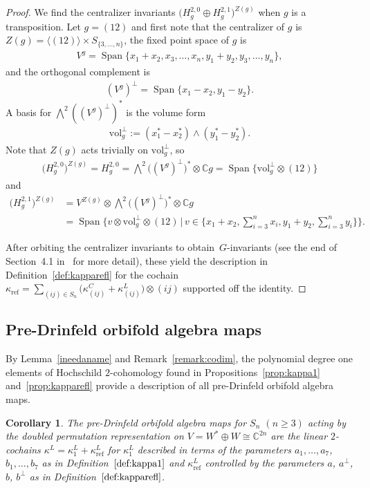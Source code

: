 \documentclass[pdftex]{sigma}
\numberwithin{equation}{section}
\newtheorem{Corollary}[Theorem]{Corollary}
\newcommand{\vol}[1]{\text{vol}_{#1}^{\perp}}
\DeclareMathOperator{\Span}{Span}
\DeclareMathOperator{\refl}{ref}
\begin{document}
\begin{proof}
We find the centralizer invariants $\big(H_g^{2,0}\oplus H_g^{2,1}\big)^{Z(g)}$ when $g$ is a transposition.
Let $g=(12)$ and first note that the centralizer of $g$ is $Z(g)=\langle (12) \rangle \times S_{\{3,\dots,n\}}$, the fixed point space of $g$ is
\begin{gather*}
V^g=\Span\{x_1+x_2,x_3,\dots,x_n,y_1+y_2,y_3,\dots,y_n\},
\end{gather*}
and the orthogonal complement is
\begin{gather*}
(V^g)^\perp=\Span\{x_1-x_2,y_1-y_2\}.
\end{gather*}
A basis for $\bigwedge^2 ((V^g)^{\perp})^*$
is the volume form
	\begin{gather*}
	\vol{g}:=(x_1^*-x_2^*)\wedge (y_1^*-y_2^*).
	\end{gather*}
Note that $Z(g)$ acts trivially on $\vol{g}$, so
 	\begin{gather*}
	\big(H_g^{2,0}\big)^{Z(g)}=H_g^{2,0}=\bigwedge\nolimits^{\! 2} \big((V^g)^{\perp}\big)^* \otimes \mathbb{C} g=\Span\big\{\vol{g} \otimes (12) \big\}
	\end{gather*}
and
\begin{align*}
\big(H_g^{2,1}\big)^{Z(g)}& =V^{Z(g)}\otimes\bigwedge\nolimits^{\! 2} \big((V^g)^{\perp}\big)^* \otimes \mathbb{C} g
\\
&=\Span\bigg\{v \otimes \vol{g} \otimes (12) \,\bigg\vert\, v \in \bigg\{x_1+x_2, \sum\limits_{i=3}^n x_i, y_1+y_2, \sum\limits_{i=3}^n y_i \bigg\}\bigg\}.
\end{align*}

After orbiting the centralizer invariants to obtain~$G$-invariants (see the end of Section~4.1 in~\cite{FGK} for more detail), these yield the description in Definition~\ref{def:kapparefl} for the cochain $\kappa_{\refl}=\sum_{(ij) \in S_n} \big(\kappa^C_{(ij)}+\kappa^L_{(ij)}\big)\otimes (ij)$ supported off the identity.
\end{proof}

\subsection{Pre-Drinfeld orbifold algebra maps}
By Lemma~\ref{ineedaname} and Remark~\ref{remark:codim}, the polynomial
degree one elements of Hochschild $2$-cohomology found in
Propositions~\ref{prop:kappa1} and~\ref{prop:kapparefl}
provide a description of all pre-Drinfeld orbifold algebra maps.

\begin{Corollary}
\label{preDOAmaps}
The pre-Drinfeld orbifold algebra maps for $S_n$ $(n\geq 3)$ acting
by the doubled permutation representation on
$V=W^* \oplus W \cong \mathbb{C}^{2n}$ are the linear $2$-cochains
$\kappa^L=\kappa^L_1+\kappa^L_{\refl}$ for $\kappa^L_1$ described in
terms of the parameters $a_1,\dots,a_7$, $b_1,\dots,b_7$ as in
Definition~$\ref{def:kappa1}$ and
$\kappa^L_{\refl}$ controlled by the
parameters $a$, $a^\perp$, $b$, $b^\perp$
as in Definition~$\ref{def:kapparefl}$.
\end{Corollary}
\end{document}
